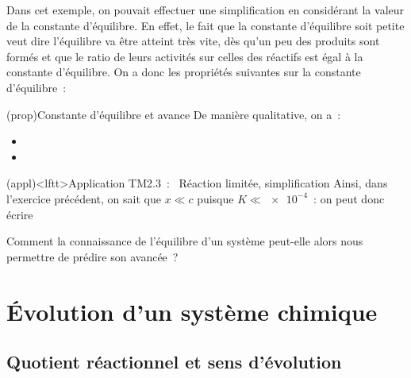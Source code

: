 \documentclass[../../main/main.tex]{subfiles}
\begin{document}
Dans cet exemple, on pouvait effectuer une simplification en considérant la
valeur de la constante d'équilibre. En effet, le fait que la constante
d'équilibre soit petite veut dire l'équilibre va être atteint très vite, dès
qu'un peu des produits sont formés et que le ratio de leurs activités sur celles
des réactifs est égal à la constante d'équilibre. On a donc les propriétés
suivantes sur la constante d'équilibre~:

\begin{tcb*}[label=prop:K](prop){Constante d'équilibre et avance\mnt}
	De manière qualitative, on a~:
	\begin{itemize}
		\item {}%
		\item {}%
	\end{itemize}
	\begin{center}
	\end{center}
\end{tcb*}

\begin{tcn}(appl)<lftt>{Application TM2.3~:~ Réaction limitée, simplification}
	Ainsi, dans l'exercice précédent, on sait que $x \ll c$ puisque $K \ll
		\num{e-4}$~: on peut donc écrire
	\psw{%
		\[
			K^\circ \approx \frac{x\ind{eq}{}^2}{c}
			\Lra
			x\ind{eq} \approx \sqrt{Kc} = \SI{1.33e-3}{mol.L^{-1}}
		\]
	}
\end{tcn}

Comment la connaissance de l'équilibre d'un système peut-elle alors nous
permettre de prédire son avancée~?

\section{Évolution d'un système chimique}
\subsection{Quotient réactionnel et sens d'évolution}
\end{document}
